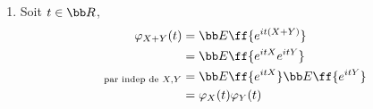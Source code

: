 {\begin{td-sol}[]
\begin{enumerate}
\begin{itemize}
                \item Pour \(X \sim \mathcal P(\lambda)\),
                \begin{equation*}
                    \begin{aligned}
                        \bb P(X=k)
                        &= \frac{e^{-\lambda}\lambda^k}{k!}\\
                        \varphi_X(t)
                        &= \bb E\ff{e^{itX}}\\
                        &= \sum_{k=0}^{\infty} e^{itk} \frac{e^{-\lambda}\lambda^k}{k!}\\
                        &= e^{-\lambda} \sum_{k=0}^{\infty} \frac{{(e^{it}\lambda)}^k}{k!}\\
                        &= e^{-\lambda} e^{e^{it}\lambda}\\
                        &= e^{\lambda(e^{it} - 1)}
                    \end{aligned}
                \end{equation*}

                \item Pour \(X \sim \mathcal N(\mu,\sigma^2)\),
                \begin{equation*}
                    \begin{aligned}
                        Y = \frac{X - \mu}{\sigma} \sim \mathcal N(0,1)\\
                        \varphi_X(t)
                        &= \bb E\ff{e^{itX}}\\
                        &= \bb E\ff{e^{it(\mu + \sigma Y)}}\\
                        &= e^{it\mu} \bb E\ff{e^{it\sigma Y}}\\
                        &= e^{it\mu} \varphi_Y(\sigma t)\\
                        &= e^{it\mu - \frac{1}{2}\sigma^2t^2}
                    \end{aligned}
                \end{equation*}
            \end{itemize}

            \item Soit \(t \in \bb R\),
            \begin{equation*}
                \begin{aligned}
                    \varphi_{X+Y}(t)
                    &= \bb E\ff{e^{it(X+Y)}}\\
                    &= \bb E\ff{e^{itX}e^{itY}}\\
                    {}_{\text{par indep de }X,Y}&= \bb E\ff{e^{itX}}\bb E\ff{e^{itY}}\\
                    &= \varphi_X(t)\varphi_Y(t)
                \end{aligned}
            \end{equation*}


\end{enumerate}
\end{td-sol}}
